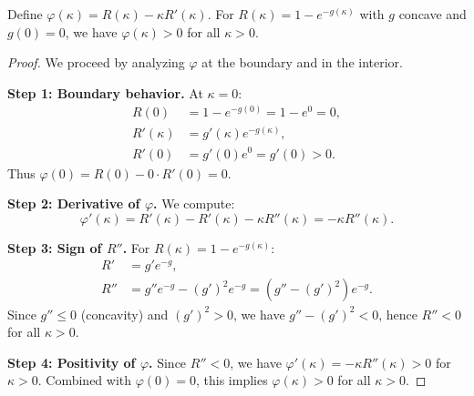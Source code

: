 \documentclass[10pt,a4paper]{amsart}
\begin{document}
\begin{lemma}
\label{lemma:phi}
Define $\varphi(\kappa) = R(\kappa) - \kappa R'(\kappa)$. For $R(\kappa) = 1 - e^{-g(\kappa)}$ with $g$ concave and $g(0) = 0$, we have $\varphi(\kappa) > 0$ for all $\kappa > 0$.
\end{lemma}

\begin{proof}
We proceed by analyzing $\varphi$ at the boundary and in the interior.

\textbf{Step 1: Boundary behavior.} At $\kappa = 0$:
\begin{align}
R(0) &= 1 - e^{-g(0)} = 1 - e^0 = 0, \\
R'(\kappa) &= g'(\kappa) e^{-g(\kappa)}, \\
R'(0) &= g'(0) e^0 = g'(0) > 0.
\end{align}
Thus $\varphi(0) = R(0) - 0 \cdot R'(0) = 0$.

\textbf{Step 2: Derivative of $\varphi$.} We compute:
\begin{equation}
\varphi'(\kappa) = R'(\kappa) - R'(\kappa) - \kappa R''(\kappa) = -\kappa R''(\kappa).
\end{equation}

\textbf{Step 3: Sign of $R''$.} For $R(\kappa) = 1 - e^{-g(\kappa)}$:
\begin{align}
R' &= g' e^{-g}, \\
R'' &= g'' e^{-g} - (g')^2 e^{-g} = (g'' - (g')^2) e^{-g}.
\end{align}
Since $g'' \leq 0$ (concavity) and $(g')^2 > 0$, we have $g'' - (g')^2 < 0$, hence $R'' < 0$ for all $\kappa > 0$.

\textbf{Step 4: Positivity of $\varphi$.} Since $R'' < 0$, we have $\varphi'(\kappa) = -\kappa R''(\kappa) > 0$ for $\kappa > 0$. Combined with $\varphi(0) = 0$, this implies $\varphi(\kappa) > 0$ for all $\kappa > 0$.
\end{proof}
\end{document}
